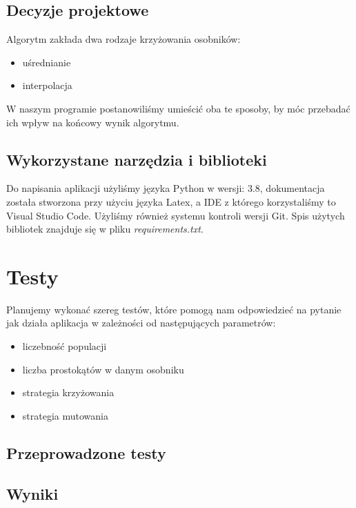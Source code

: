 \documentclass{article}
\begin{document}
\subsection{Decyzje projektowe}
Algorytm zakłada dwa rodzaje krzyżowania osobników:
\begin{itemize}
    \item uśrednianie
    \item interpolacja
\end{itemize}
W naszym programie postanowiliśmy umieścić oba te sposoby, by móc przebadać ich wpływ na końcowy wynik algorytmu.
\subsection{Wykorzystane narzędzia i biblioteki}
Do napisania aplikacji użyliśmy języka Python w wersji: 3.8, dokumentacja została stworzona przy użyciu języka Latex, a IDE z którego korzystaliśmy to Visual Studio Code. Użyliśmy również systemu kontroli wersji Git.
Spis użytych bibliotek znajduje się w pliku {\it requirements.txt}.

\section{Testy}
Planujemy wykonać szereg testów, które pomogą nam odpowiedzieć na pytanie jak działa aplikacja w zależności od następujących parametrów:
\begin{itemize}
    \item liczebność populacji
    \item liczba prostokątów w danym osobniku
    \item strategia krzyżowania
    \item strategia mutowania
\end{itemize}
\subsection{Przeprowadzone testy}
\subsection{Wyniki}
\end{document}
